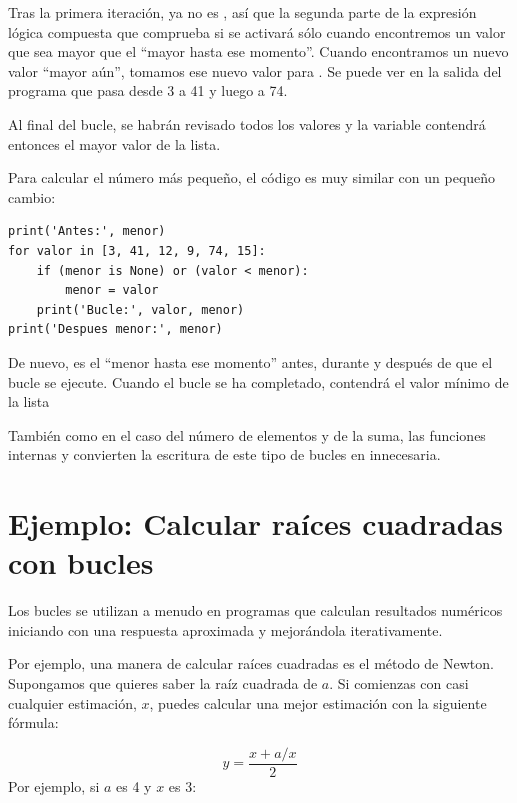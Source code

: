 Tras la primera iteración,  ya no es , así
que la segunda parte de la expresión lógica compuesta que comprueba si
 se activará sólo cuando
encontremos un valor que sea mayor que el ``mayor hasta ese momento''.
Cuando encontramos un nuevo valor ``mayor aún'', tomamos ese nuevo valor
para . Se puede ver en la salida del programa que
 pasa desde 3 a 41 y luego a 74.

Al final del bucle, se habrán revisado todos los valores y la variable
 contendrá entonces el mayor valor de la lista.

Para calcular el número más pequeño, el código es muy similar con un
pequeño cambio:

\begin{Verbatim}[frame=single]
print('Antes:', menor)
for valor in [3, 41, 12, 9, 74, 15]:
    if (menor is None) or (valor < menor):
        menor = valor
    print('Bucle:', valor, menor)
print('Despues menor:', menor)
\end{Verbatim}

De nuevo,  es el ``menor hasta ese momento'' antes,
durante y después de que el bucle se ejecute. Cuando el bucle se ha
completado,  contendrá el valor mínimo de la lista

También como en el caso del número de elementos y de la suma, las
funciones internas  y  convierten la
escritura de este tipo de bucles en innecesaria.



\section{Ejemplo: Calcular raíces cuadradas con bucles}
\label{squareroot}

Los bucles se utilizan a menudo en programas que calculan
resultados numéricos iniciando con una respuesta aproximada y
mejorándola iterativamente.

Por ejemplo, una manera de calcular raíces cuadradas es el método de Newton.
Supongamos que quieres saber la raíz cuadrada de $a$.  Si comienzas
con casi cualquier estimación, $x$, puedes calcular una mejor
estimación con la siguiente fórmula:

\[ y = \frac{x + a/x}{2} \]
%
Por ejemplo, si $a$ es 4 y $x$ es 3:

